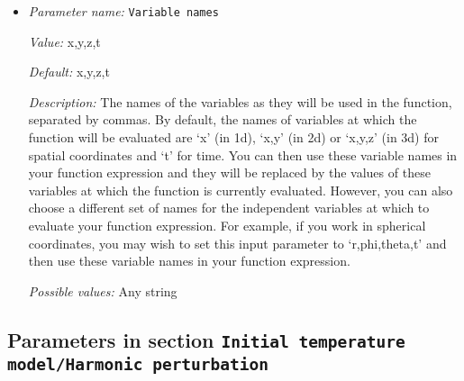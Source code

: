 \begin{itemize}
{\it Value:} 0


{\it Default:} 0


{\it Description:} The formula that denotes the function you want to evaluate for particular values of the independent variables. This expression may contain any of the usual operations such as addition or multiplication, as well as all of the common functions such as `sin' or `cos'. In addition, it may contain expressions like `if(x>0, 1, -1)' where the expression evaluates to the second argument if the first argument is true, and to the third argument otherwise. For a full overview of possible expressions accepted see the documentation of the muparser library at http://muparser.beltoforion.de/.

If the function you are describing represents a vector-valued function with multiple components, then separate the expressions for individual components by a semicolon.


{\it Possible values:} Any string
\item {\it Parameter name:} {\tt Variable names}
\label{parameters:Initial temperature model/Function/Variable names}
\label{parameters:Initial_20temperature_20model/Function/Variable_20names}


{\it Value:} x,y,z,t


{\it Default:} x,y,z,t


{\it Description:} The names of the variables as they will be used in the function, separated by commas. By default, the names of variables at which the function will be evaluated are `x' (in 1d), `x,y' (in 2d) or `x,y,z' (in 3d) for spatial coordinates and `t' for time. You can then use these variable names in your function expression and they will be replaced by the values of these variables at which the function is currently evaluated. However, you can also choose a different set of names for the independent variables at which to evaluate your function expression. For example, if you work in spherical coordinates, you may wish to set this input parameter to `r,phi,theta,t' and then use these variable names in your function expression.


{\it Possible values:} Any string
\end{itemize}

\subsection{Parameters in section \tt Initial temperature model/Harmonic perturbation}
\label{parameters:Initial_20temperature_20model/Harmonic_20perturbation}

